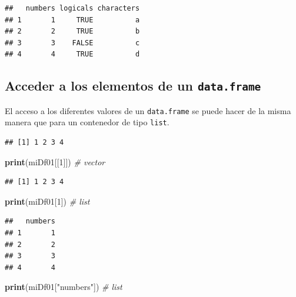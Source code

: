 \documentclass[
]{book}
\newenvironment{Shaded}{\begin{snugshade}}{\end{snugshade}}
\newcommand{\CommentTok}[1]{\textcolor[rgb]{0.56,0.35,0.01}{\textit{#1}}}
\newcommand{\DecValTok}[1]{\textcolor[rgb]{0.00,0.00,0.81}{#1}}
\newcommand{\KeywordTok}[1]{\textcolor[rgb]{0.13,0.29,0.53}{\textbf{#1}}}
\newcommand{\NormalTok}[1]{#1}
\newcommand{\OperatorTok}[1]{\textcolor[rgb]{0.81,0.36,0.00}{\textbf{#1}}}
\newcommand{\StringTok}[1]{\textcolor[rgb]{0.31,0.60,0.02}{#1}}
\begin{document}
\begin{verbatim}
##   numbers logicals characters
## 1       1     TRUE          a
## 2       2     TRUE          b
## 3       3    FALSE          c
## 4       4     TRUE          d
\end{verbatim}

\hypertarget{acceder-a-los-elementos-de-un-data.frame}{%
\subsection{\texorpdfstring{Acceder a los elementos de un \texttt{data.frame}}{Acceder a los elementos de un data.frame}}\label{acceder-a-los-elementos-de-un-data.frame}}

El acceso a los diferentes valores de un \texttt{data.frame} se puede hacer de la misma manera que para un contenedor de tipo \texttt{list}.

\begin{Shaded}
\end{Shaded}

\begin{verbatim}
## [1] 1 2 3 4
\end{verbatim}

\begin{Shaded}
\begin{Highlighting}[]
\KeywordTok{print}\NormalTok{(miDf01[[}\DecValTok{1}\NormalTok{]]) }\CommentTok{# vector}
\end{Highlighting}
\end{Shaded}

\begin{verbatim}
## [1] 1 2 3 4
\end{verbatim}

\begin{Shaded}
\begin{Highlighting}[]
\KeywordTok{print}\NormalTok{(miDf01[}\DecValTok{1}\NormalTok{]) }\CommentTok{# list}
\end{Highlighting}
\end{Shaded}

\begin{verbatim}
##   numbers
## 1       1
## 2       2
## 3       3
## 4       4
\end{verbatim}

\begin{Shaded}
\begin{Highlighting}[]
\KeywordTok{print}\NormalTok{(miDf01[}\StringTok{"numbers"}\NormalTok{]) }\CommentTok{# list}
\end{Highlighting}
\end{Shaded}
\end{document}
